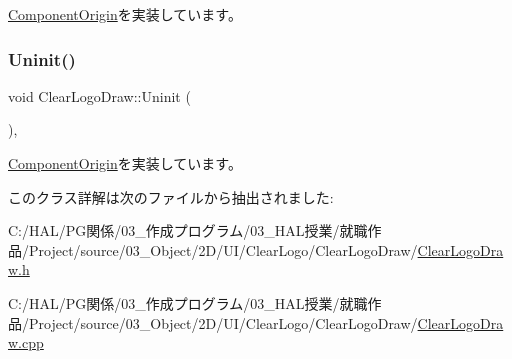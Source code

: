 \mbox{\hyperlink{class_component_origin_a9f674891257f2272b1636d8b6bb05d81}{Component\+Origin}}を実装しています。

\mbox{\label{class_clear_logo_draw_aa73db5b701e644f8e552ddb254a0a9aa}} 
\subsubsection{\texorpdfstring{Uninit()}{Uninit()}}
{\footnotesize\ttfamily void Clear\+Logo\+Draw\+::\+Uninit (\begin{DoxyParamCaption}{ }\end{DoxyParamCaption})\hspace{0.3cm}{\ttfamily [override]}, {\ttfamily [virtual]}}



\mbox{\hyperlink{class_component_origin_a9f89a93f9c1954bd53f9750e35e6089d}{Component\+Origin}}を実装しています。



このクラス詳解は次のファイルから抽出されました\+:\begin{DoxyCompactItemize}
\item 
C\+:/\+H\+A\+L/\+P\+G関係/03\+\_\+作成プログラム/03\+\_\+\+H\+A\+L授業/就職作品/\+Project/source/03\+\_\+\+Object/2\+D/\+U\+I/\+Clear\+Logo/\+Clear\+Logo\+Draw/\mbox{\hyperlink{_clear_logo_draw_8h}{Clear\+Logo\+Draw.\+h}}\item 
C\+:/\+H\+A\+L/\+P\+G関係/03\+\_\+作成プログラム/03\+\_\+\+H\+A\+L授業/就職作品/\+Project/source/03\+\_\+\+Object/2\+D/\+U\+I/\+Clear\+Logo/\+Clear\+Logo\+Draw/\mbox{\hyperlink{_clear_logo_draw_8cpp}{Clear\+Logo\+Draw.\+cpp}}\end{DoxyCompactItemize}
